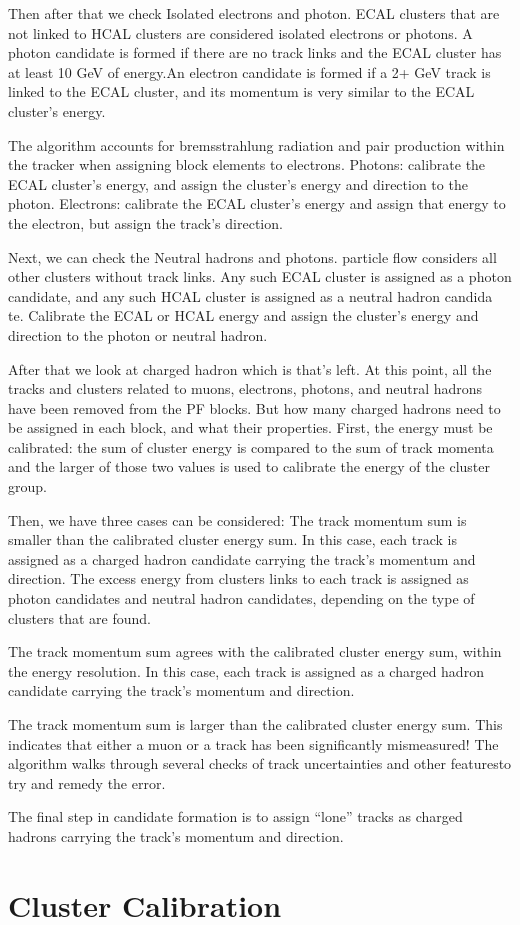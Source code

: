 Then after that we check Isolated electrons and photon. ECAL clusters that are not linked to HCAL clusters are considered isolated electrons or photons.  A photon candidate is formed if there are no track links and the ECAL cluster has at least 10 GeV of energy.An electron candidate is formed if a 2+ GeV track is linked to the ECAL cluster, and its momentum is very similar to the ECAL cluster’s energy.

The algorithm accounts for bremsstrahlung radiation and pair production within the tracker when assigning block elements to electrons. Photons: calibrate the ECAL cluster’s energy, and assign the cluster’s energy and direction to the photon. Electrons: calibrate the ECAL cluster’s energy and assign that energy to the electron, but assign the track’s direction.

Next, we can check the Neutral hadrons and photons. particle flow considers all other clusters without track links. Any such ECAL cluster is assigned as a photon candidate, and any such HCAL cluster is assigned as a neutral hadron candida te. Calibrate the ECAL or HCAL energy and assign the cluster’s energy and direction to the photon or neutral hadron.

 After that we look at charged hadron which is that’s left. At this point, all the tracks and clusters related to muons, electrons, photons, and neutral hadrons have been removed from the PF blocks.  But how many charged hadrons need to be assigned in each block, and what their properties. First, the energy must be calibrated: the sum of cluster energy is compared to the sum of track momenta and the larger of those two values is used to calibrate the energy of the cluster group.

Then, we have three cases can be considered: The track momentum sum is smaller than the calibrated cluster energy sum. In this case, each track is assigned as a charged hadron candidate carrying the track’s momentum and direction. The excess energy from clusters links to each track is assigned as photon candidates and neutral hadron candidates, depending on the type of clusters that are found.

The track momentum sum agrees with the calibrated cluster energy sum, within the energy resolution.  In this case, each track is assigned as a charged hadron candidate carrying the track’s momentum and direction.

The track momentum sum is larger than the calibrated cluster energy sum. This indicates that either a muon or a track has been significantly mismeasured! The algorithm walks through several checks of track uncertainties and other featuresto try and remedy the error.

The final step in candidate formation is to assign “lone” tracks as charged hadrons carrying the track’s momentum and direction.

\section{Cluster Calibration}


